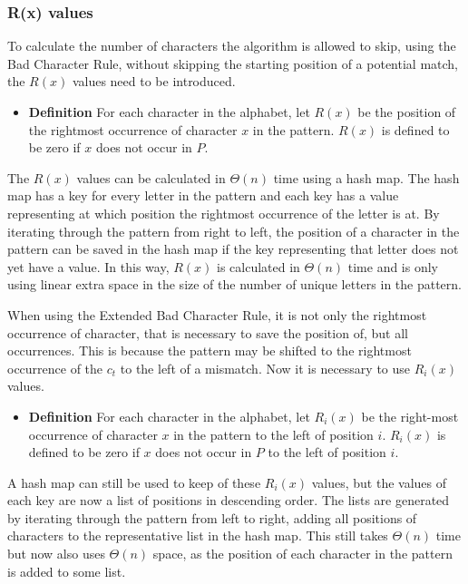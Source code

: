 \subsubsection{R(x) values}
To calculate the number of characters the algorithm is allowed to skip, using the Bad Character Rule, without skipping the starting position of a potential match, the $R(x)$ values need to be introduced. 

\begin{itemize}
    \item[] \textbf{Definition} For each character in the alphabet, let $R(x)$ be the position of the rightmost occurrence of character $x$ in the pattern. $R(x)$ is defined to be zero if $x$ does not occur in $P$.
\end{itemize}

The $R(x)$ values can be calculated in $\Theta(n)$ time using a hash map. The hash map has a key for every letter in the pattern and each key has a value representing at which position the rightmost occurrence of the letter is at. By iterating through the pattern from right to left, the position of a character in the pattern can be saved in the hash map if the key representing that letter does not yet have a value. In this way, $R(x)$ is calculated in $\Theta(n)$ time and is only using linear extra space in the size of the number of unique letters in the pattern.


When using the Extended Bad Character Rule, it is not only the rightmost occurrence of character, that is necessary to save the position of, but all occurrences. This is because the pattern may be shifted to the rightmost occurrence of the $c_t$ to the left of a mismatch. Now it is necessary to use $R_i(x)$ values.

\begin{itemize}
    \item[] \textbf{Definition} For each character in the alphabet, let $R_i(x)$ be the right-most occurrence of character $x$ in the pattern to the left of position $i$. $R_i(x)$ is defined to be zero if $x$ does not occur in $P$ to the left of position $i$.
\end{itemize}

A hash map can still be used to keep of these $R_i(x)$ values, but the values of each key are now a list of positions in descending order. The lists are generated by iterating through the pattern from left to right, adding all positions of characters to the representative list in the hash map. This still takes $\Theta(n)$ time but now also uses $\Theta(n)$ space, as the position of each character in the pattern is added to some list.

